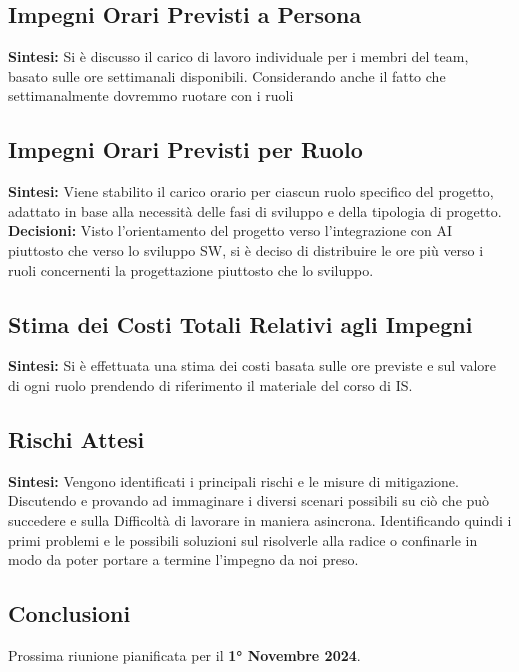 \documentclass{article}
\begin{document}
\subsection{Impegni Orari Previsti a Persona}
\textbf{Sintesi:} Si è discusso il carico di lavoro individuale per i membri del team, basato sulle ore settimanali disponibili. Considerando anche il fatto che settimanalmente dovremmo ruotare con i ruoli

\subsection{Impegni Orari Previsti per Ruolo}
\textbf{Sintesi:} Viene stabilito il carico orario per ciascun ruolo specifico del progetto, adattato in base alla necessità delle fasi di sviluppo e della tipologia di progetto. \\
\textbf{Decisioni:} Visto l'orientamento del progetto verso l'integrazione con AI piuttosto che verso lo sviluppo SW, si è deciso di distribuire le ore più verso i ruoli concernenti la progettazione piuttosto che lo sviluppo.

\subsection{Stima dei Costi Totali Relativi agli Impegni}
\textbf{Sintesi:} Si è effettuata una stima dei costi basata sulle ore previste e sul valore di ogni ruolo prendendo di riferimento il materiale del corso di IS.

\subsection{Rischi Attesi}
\textbf{Sintesi:} Vengono identificati i principali rischi e le misure di mitigazione. Discutendo e provando ad immaginare i diversi scenari possibili su ciò che può succedere e sulla Difficoltà di lavorare in maniera asincrona.
Identificando quindi i primi problemi e le possibili soluzioni sul risolverle alla radice o confinarle in modo da poter portare a termine l'impegno da noi preso.

\subsection*{Conclusioni}
Prossima riunione pianificata per il \textbf{1° Novembre 2024}.
\end{document}
